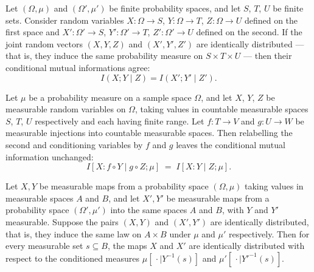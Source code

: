 \begin{theorem}
\label{ProbabilityTheory.IdentDistrib.condMutualInfo_eq_finite}
\leanok
{}
Let $(\Omega,\mu)$ and $(\Omega',\mu')$ be finite probability spaces, and let $S$, $T$,
$U$ be finite sets. Consider random variables $X\colon\Omega\to S$, $Y\colon\Omega\to
T$, $Z\colon\Omega\to U$ defined on the first space and $X'\colon\Omega'\to S$,
$Y'\colon\Omega'\to T$, $Z'\colon\Omega'\to U$ defined on the second. If the joint
random vectors $(X,Y,Z)$ and $(X',Y',Z')$ are identically distributed — that is, they
induce the same probability measure on $S\times T\times U$ — then their conditional
mutual informations agree: \[ I(X;Y\mid Z) = I(X';Y'\mid Z'). \]
\end{theorem}

\begin{theorem}
\label{ProbabilityTheory.condMutualInfo_comp_right_conditioning_of_injective}
\leanok
{}
Let $\mu$ be a probability measure on a sample space $\Omega$, and let $X$, $Y$, $Z$ be
measurable random variables on $\Omega$, taking values in countable measurable spaces
$S$, $T$, $U$ respectively and each having finite range. Let $f\colon T\to V$ and
$g\colon U\to W$ be measurable injections into countable measurable spaces. Then
relabelling the second and conditioning variables by $f$ and $g$ leaves the conditional
mutual information unchanged:
\[
  I[X : f\circ Y \mid g\circ Z ; \mu] \;=\; I[X : Y \mid Z ; \mu].
\]
\end{theorem}

\begin{theorem}
\label{ProbabilityTheory.IdentDistrib.cond_of_pair}
\leanok
{}
Let $X, Y$ be measurable maps from a probability space $(\Omega, \mu)$ taking values in
measurable spaces $A$ and $B$, and let $X', Y'$ be measurable maps from a probability
space $(\Omega', \mu')$ into the same spaces $A$ and $B$, with $Y$ and $Y'$ measurable.
Suppose the pairs $(X, Y)$ and $(X', Y')$ are identically distributed, that is, they
induce the same law on $A \times B$ under $\mu$ and $\mu'$ respectively. Then for every
measurable set $s \subseteq B$, the maps $X$ and $X'$ are identically distributed with
respect to the conditioned measures $\mu[\,\cdot \mid Y^{-1}(s)]$ and $\mu'[\,\cdot \mid
Y'^{-1}(s)]$.
\end{theorem}

